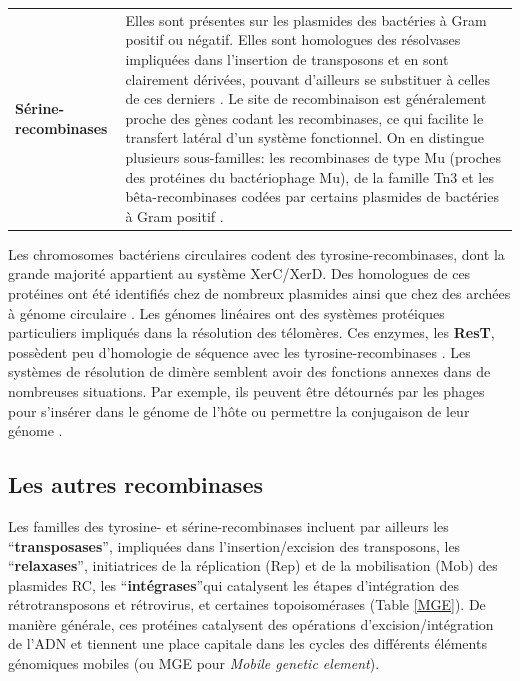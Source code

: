 \begin{longtable}{@{\hspace{-3cm}\hspace{1cm}} >{\bfseries}p{} | >{\small}p{}}
	\\[-0.2cm]
	Sérine-recombinases & Elles sont présentes sur les plasmides des bactéries à Gram positif ou négatif. Elles sont homologues des résolvases impliquées dans l'insertion de transposons et en sont clairement dérivées, pouvant d'ailleurs se substituer à celles de ces derniers \citep{hallet2004dna}. Le site de recombinaison est généralement proche des gènes codant les recombinases, ce qui facilite le transfert latéral d'un système fonctionnel. On en distingue plusieurs sous-familles: les recombinases de type Mu (proches des protéines du bactériophage Mu), de la famille Tn3 et les bêta-recombinases codées par certains plasmides de bactéries à Gram positif \citep{hallet2004dna}.
\end{longtable}
 
	Les chromosomes bactériens circulaires codent des tyrosine-recombinases, dont la grande majorité appartient au système XerC/XerD. Des homologues de ces protéines ont été identifiés chez de nombreux plasmides ainsi que chez des archées à génome circulaire \citep{hallet2004dna}. Les génomes linéaires ont des systèmes protéiques particuliers impliqués dans la résolution des télomères. Ces enzymes, les \textbf{ResT}, possèdent peu d'homologie de séquence avec les tyrosine-recombinases \citep{chaconas2005replication}. Les systèmes de résolution de dimère semblent avoir des fonctions annexes dans de nombreuses situations. Par exemple, ils peuvent être détournés par les phages pour s'insérer dans le génome de l'hôte ou permettre la conjugaison de leur génome \citep{Das2013,hallet2004dna} .
 
 
\subsection{Les autres recombinases}\label{parmge}
	Les familles des tyrosine- et sérine-recombinases incluent par ailleurs les “\textbf{transposases}”, impliquées dans l'insertion/excision des transposons, les “\textbf{relaxases}”, initiatrices de la réplication (Rep) et de la mobilisation (Mob) des plasmides RC, les “\textbf{intégrases}”qui catalysent les étapes d'intégration des rétrotransposons et rétrovirus, et certaines topoisomérases (Table \ref{MGE}). De manière générale, ces protéines catalysent des opérations d'excision/intégration de l'ADN et tiennent une place capitale dans les cycles des différents éléments génomiques mobiles (ou MGE pour \textit{Mobile genetic element}). 


